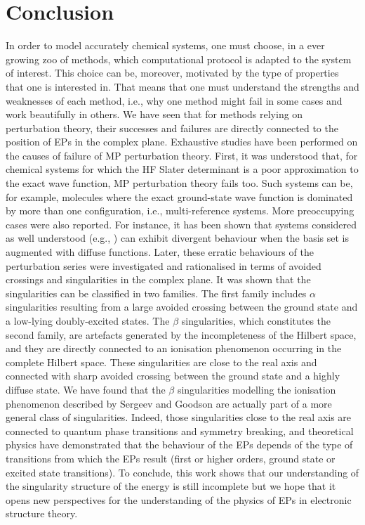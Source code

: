 \documentclass[aps,prb,reprint,noshowkeys,linenumbers,superscriptaddress]{revtex4-1}
\newcommand{\latin}[1]{#1}
\newcommand{\ie}{\latin{i.e.}}
\newcommand{\eg}{\latin{e.g.}}
\begin{document}
\section{Conclusion}

In order to model accurately chemical systems, one must choose, in a ever growing zoo of methods, which computational protocol is adapted to the system of interest.
This choice can be, moreover, motivated by the type of properties that one is interested in.
That means that one must understand the strengths and weaknesses of each method, \ie, why one method might fail in some cases and work beautifully in others. 
We have seen that for methods relying on perturbation theory, their successes and failures are directly connected to the position of EPs in the complex plane. 
Exhaustive studies have been performed on the causes of failure of MP perturbation theory. 
First, it was understood that, for chemical systems for which the HF Slater determinant is a poor approximation to the exact wave function, MP perturbation theory fails too. 
Such systems can be, for example, molecules where the exact ground-state wave function is dominated by more than one configuration, \ie, multi-reference systems. 
More preoccupying cases were also reported. 
For instance, it has been shown that systems considered as well understood (\eg, ) can exhibit divergent behaviour when the basis set is augmented with diffuse functions. 
Later, these erratic behaviours of the perturbation series were investigated and rationalised in terms of avoided crossings and singularities in the complex plane. 
It was shown that the singularities can be classified in two families. 
The first family includes $\alpha$ singularities resulting from a large avoided crossing between the ground state and a low-lying doubly-excited states. 
The $\beta$ singularities, which constitutes the second family, are artefacts generated by the incompleteness of the Hilbert space, and they are directly connected to an ionisation phenomenon occurring in the complete Hilbert space. 
These singularities are close to the real axis and connected with sharp avoided crossing between the ground state and a highly diffuse state. 
We have found that the $\beta$ singularities modelling the ionisation phenomenon described by Sergeev and Goodson are actually part of a more general class of singularities. 
Indeed, those singularities close to the real axis are connected to quantum phase transitions and symmetry breaking, and theoretical physics have demonstrated that the behaviour of the EPs depends of the type of transitions from which the EPs result (first or higher orders, ground state or excited state transitions).
To conclude, this work shows that our understanding of the singularity structure of the energy is still incomplete but we hope that it opens new perspectives for the understanding of the physics of EPs in electronic structure theory.
\end{document}
